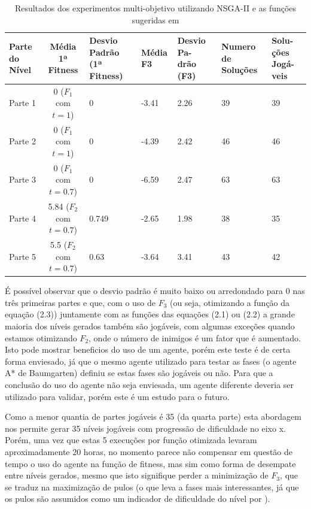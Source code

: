 \begin{table}[h]
    \centering
    \begin{tabular}{|p{2cm}|c|p{2cm}|p{1cm}|p{1cm}|p{2cm}|p{1cm}|}
            \hline
        \textbf{Parte do Nível} & \textbf{Média 1ª Fitness} & \textbf{Desvio Padrão (1ª Fitness)} & \textbf{Média F3} & \textbf{Desvio Pa- drão (F3)} & \textbf{Numero de Soluções} & \textbf{Solu- ções Jogá- veis} \\
            \hline
        Parte 1 & 0 ($F_1$ com $t = 1$) & 0     & -3.41 & 2.26 & 39 & 39 \\
        Parte 2 & 0 ($F_1$ com $t = 1$) & 0     & -4.39 & 2.42 & 46 & 46 \\
        Parte 3 & 0 ($F_1$ com $t = 0.7$) & 0   & -6.59 & 2.47 & 63 & 63 \\
        Parte 4 & 5.84 ($F_2$ com $t = 0.7$) & 0.749    & -2.65 & 1.98 & 38 & 35 \\
        Parte 5 & 5.5 ($F_2$ com $t = 0.7$) & 0.63      & -3.64 & 3.41 & 43 & 42 \\
           \hline
    \end{tabular}
        \caption{Resultados dos experimentos multi-objetivo utilizando NSGA-II e as funções sugeridas em \citet{marioGAN}}
    \label{tab:summary}
\end{table}

É possível observar que o desvio padrão é muito baixo ou arredondado para 0 nas três primeiras partes e que, com o uso de $F_3$ (ou seja, otimizando a função da equação (2.3)) juntamente com as funções das equações (2.1) ou (2.2) a grande maioria dos níveis gerados também são jogáveis, com algumas exceções quando estamos otimizando $F_2$, onde o número de inimigos é um fator que é aumentado. Isto pode mostrar beneficios do uso de um agente, porém este teste é de certa forma enviesado, já que o mesmo agente utilizado para testar as fases (o agente A* de Baumgarten) definiu se estas fases são jogáveis ou não. Para que a conclusão do uso do agente não seja enviesada, um agente diferente deveria ser utilizado para validar, porém este é um estudo para o futuro. 

Como a menor quantia de partes jogáveis é 35 (da quarta parte) esta abordagem nos permite gerar 35 níveis jogáveis com progressão de dificuldade no eixo x. Porém, uma vez que estas 5 execuções por função otimizada levaram aproximadamente 20 horas, no momento parece não compensar em questão de tempo o uso do agente na função de fitness, mas sim como forma de desempate entre níveis gerados, mesmo que isto signifique perder a minimização de $F_3$, que se traduz na maximização de pulos (o que leva a fases mais interessantes, já que os pulos são assumidos como um indicador de dificuldade do nível por \citep{marioGAN}).


